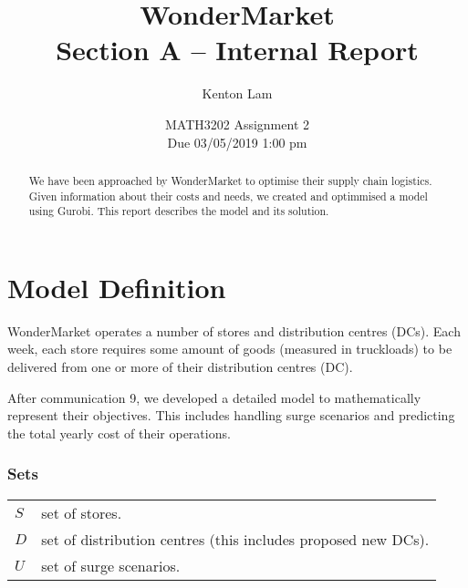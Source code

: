 \documentclass[11pt,a4paper]{article}
\author{Kenton Lam}
\date{{MATH3202 Assignment 2 \\ Due 03/05/2019 1:00 pm}}
\title{WonderMarket \\ Section A -- Internal Report}
\begin{document}
\maketitle
\begin{abstract}
    We have been approached by WonderMarket to optimise their supply chain logistics.
    Given information about their costs and needs, we created and optimmised a model using Gurobi.
    This report describes the model and its solution.
\end{abstract}

\part{Model Definition}
WonderMarket operates a number of stores and distribution centres (DCs).
Each week, each store requires some amount of goods (measured in truckloads)
to be delivered from one or more of their distribution centres (DC).

After communication 9, we developed a detailed model to mathematically represent
their objectives. This includes handling surge scenarios and predicting the 
total yearly cost of their operations.

\section{Sets}
\begin{tabular}{l l}
    $S$ & set of stores. \\ 
    $D$ & set of distribution centres (this includes proposed new DCs). \\ 
    $U$ & set of surge scenarios.   
\end{tabular}
\end{document}
